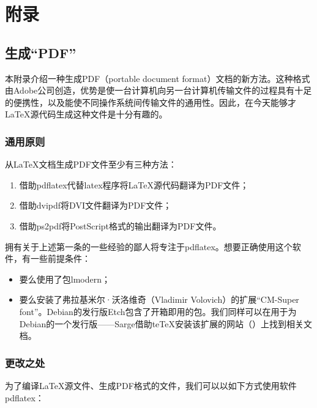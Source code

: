 \part{附录}
\appendix
\chapter{生成``PDF''}

本附录介绍一种生成PDF（portable document format）文档的新方法。这种格式由Adobe公司创造，优势是使一台计算机向另一台计算机传输文件的过程具有十足的便携性，以及能使不同操作系统间传输文件的通用性。因此，在今天能够才\LaTeX 源代码生成这种文件是十分有趣的。

\section{通用原则}

从\LaTeX 文档生成PDF文件至少有三种方法：

\begin{enumerate}
    \item 借助\textsf{pdflatex}代替\textsf{latex}程序将\LaTeX 源代码翻译为PDF文件；
    \item 借助\textsf{dvipdf}将DVI文件翻译为PDF文件；
    \item 借助\textsf{ps2pdf}将PostScript格式的输出翻译为PDF文件。
\end{enumerate}

\begin{exclamation}
拥有关于上述第一条的一些经验的鄙人将专注于pdflatex。想要正确使用这个软件，有一些前提条件：

\begin{itemize}
    \item 要么使用了包lmodern；
    \item 要么安装了弗拉基米尔·沃洛维奇（Vladimir Volovich）的扩展``CM-Super font''。Debian的发行版Etch包含了开箱即用的包。我们同样可以在用于为Debian的一个发行版——Sarge借助te\TeX 安装该扩展的网站（）上找到相关文档。
\end{itemize}
\end{exclamation}

\section{更改之处}

为了编译\LaTeX 源文件、生成PDF格式的文件，我们可以以如下方式使用软件\textsf{pdflatex}：

